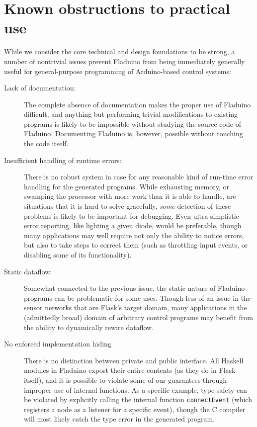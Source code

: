 \documentclass[a4paper, oneside, final]{memoir}
\begin{document}
\section{Known obstructions to practical use}

While we consider the core technical and design foundations to be
strong, a number of nontrivial issues prevent Fladuino from being
immediately generally useful for general-purpose programming of
Arduino-based control systems:

\begin{description}
\item[Lack of documentation:] The complete absence of documentation
  makes the proper use of Fladuino difficult, and anything but
  performing trivial modifications to existing programs is likely to
  be impossible without studying the source code of Fladuino.
  Documenting Fladuino is, however, possible without touching the code
  itself.
\item[Insufficient handling of runtime errors:] There is no robust
  system in case for any reasonable kind of run-time error handling
  for the generated programs.  While exhausting memory, or swamping
  the processor with more work than it is able to handle, are
  situations that it is hard to solve gracefully, \textit{some}
  detection of these problems is likely to be important for debugging.
  Even ultra-simplistic error reporting, like lighting a given diode,
  would be preferable, though many applications may well require not
  only the ability to notice errors, but also to take steps to correct
  them (such as throttling input events, or disabling some of its
  functionality).
\item[Static dataflow:] Somewhat connected to the previous issue, the
  static nature of Fladuino programs can be problematic for some uses.
  Though less of an issue in the sensor networks that are Flask's
  target domain, many applications in the (admittedly broad) domain of
  arbitrary control programs may benefit from the ability to
  dynamically rewire dataflow.
\item[No enforced implementation hiding] There is no distinction
  between private and public interface.  All Haskell modules in
  Fladuino export their entire contents (as they do in Flask itself),
  and it is possible to violate some of our guarantees through
  improper use of internal functions.  As a specific example,
  type-safety can be violated by explicitly calling the internal
  function \texttt{connectEvent} (which registers a node as a listener
  for a specific event), though the C compiler will most likely catch
  the type error in the generated program.
\end{description}
\end{document}
